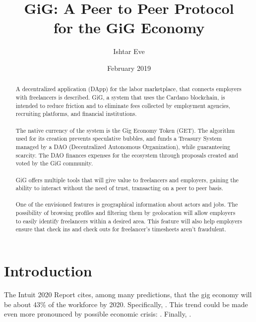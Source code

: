 \documentclass{article}
\title{GiG: A Peer to Peer Protocol \\for the GiG Economy}
\author{Ishtar Eve}
\date{February 2019}
\begin{document}
\maketitle

\begin{abstract}
A decentralized application (DApp) for the labor marketplace, that connects employers with freelancers is described. GiG, a system that uses the Cardano blockchain, is intended to reduce friction and to eliminate fees collected by employment agencies, recruiting platforms, and financial institutions.

\paragraph{} The native currency of the system is the Gig Economy Token (GET). The algorithm used for its creation prevents speculative bubbles, and funds a Treasury System managed by a DAO (Decentralized Autonomous Organization), while guaranteeing scarcity. The DAO finances expenses for the ecosystem through proposals created and voted by the GiG community.

\paragraph{} GiG offers multiple tools that will give value to freelancers and employers, gaining the ability to interact without the need of trust, transacting on a peer to peer basis.

\paragraph{} One of the envisioned features is geographical information about actors and jobs. The possibility of browsing profiles and filtering them by geolocation will allow employers to easily identify freelancers within a desired area. This feature will also help employers ensure that check ins and check outs for freelancer's timesheets aren't fraudulent.

\end{abstract}

\newpage
\tableofcontents
\newpage

\section{Introduction}

The Intuit 2020 Report\cite{intuit-2020-report} cites, among many predictions, that the gig economy will be about 43\% of the workforce by 2020. Specifically, . This trend could be made even more pronounced by possible economic crisis: . Finally, .
\end{document}
